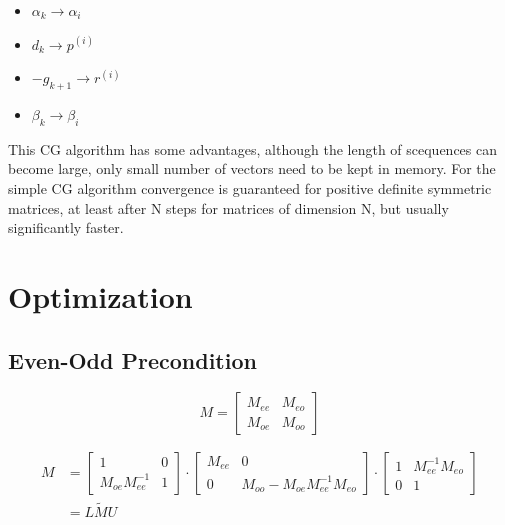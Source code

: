 \documentclass[11pt]{article} %
\begin{document}
\begin{itemize}
    \item $\alpha_k \to \alpha_i$
    \item $d_k \to p^{(i)}$
    \item $-g_{k+1} \to r^{(i)}$
    \item $\beta_k \to \beta_i $
\end{itemize}

This CG algorithm has some advantages, although the length of scequences can become large, only small number of vectors need to be kept in memory. For the simple CG algorithm convergence is guaranteed for positive definite symmetric matrices, at least after N steps for matrices of dimension N, but usually significantly faster.

\section{Optimization}

\noindent

\subsection{Even-Odd Precondition}

\begin{equation}
    M=\left[\begin{array}{cc}
    M_{e e} & M_{e o} \\
    M_{o e} & M_{o o}
    \end{array}\right]
\end{equation}

\begin{equation}
    \begin{aligned}
    M &=\left[\begin{array}{cc}
    1 & 0 \\
    M_{o e} M_{e e}^{-1} & 1
    \end{array}\right] \cdot\left[\begin{array}{cc}
    M_{e e} & 0 \\
    0 & M_{o o}-M_{o e} M_{e e}^{-1} M_{e o}
    \end{array}\right] \cdot\left[\begin{array}{cc}
    1 & M_{e e}^{-1} M_{e o} \\
    0 & 1
    \end{array}\right] \\
    &=L \tilde{M} U
    \end{aligned}
\end{equation}
\end{document}
